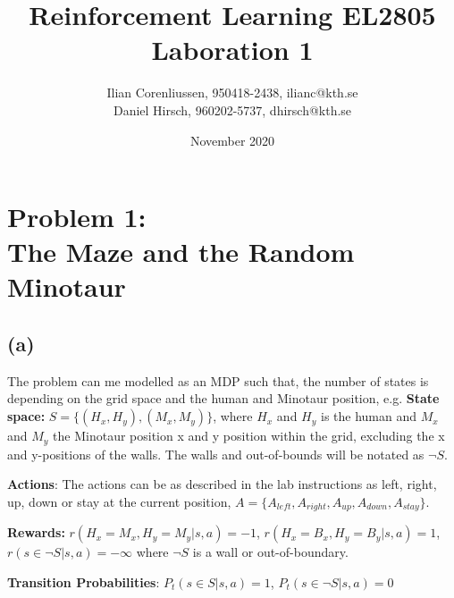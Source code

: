 \documentclass{article}
\title{Reinforcement Learning EL2805\\
       Laboration 1}
\author{Ilian Corenliussen, 950418-2438, ilianc@kth.se\\ 
        Daniel Hirsch, 960202-5737, dhirsch@kth.se}
\date{November 2020}
\begin{document}
\maketitle

\section*{Problem 1: \\
        The Maze and the Random Minotaur}
\subsection*{(a)}
The problem can me modelled as an MDP such that, the number of states is depending on the grid space and the human and Minotaur position, e.g. \textbf{State space:} $S = \{(H_x, H_y),(M_x, M_y) \} $, where $H_x$ and $H_y$ is the human and $M_x$ and $M_y$ the Minotaur position x and y position within the grid, excluding the x and y-positions of the walls. The walls and out-of-bounds will be notated as $\neg S$.

\textbf{Actions}: The actions can be as described in the lab instructions as left, right, up, down or stay at the current position, $A = \{ A_{left}, A_{right}, A_{up}, A_{down}, A_{stay} \}$. 



\textbf{Rewards:} $r(H_x = M_x , H_y = M_y |s,a) = -1 $, $r(H_x = B_x , H_y = B_y |s,a) = 1 $, $r(s\in \neg S |s,a) = -\infty $ where $\neg S$ is a wall or out-of-boundary.

\textbf{Transition Probabilities}: $P_t(s \in S |s,a) = 1$, $P_t(s \in \neg S |s,a) = 0$  
\end{document}
